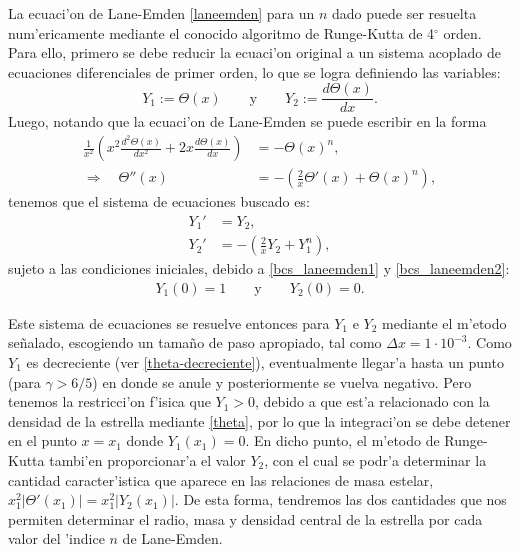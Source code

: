La ecuaci'on de Lane-Emden \eqref{laneemden} para un $n$ dado puede ser resuelta  num'ericamente mediante el conocido algoritmo de Runge-Kutta de 4${}^{\circ}$ orden. Para ello, primero se debe reducir la ecuaci'on original a un sistema acoplado de ecuaciones diferenciales de primer orden, lo que se logra definiendo las variables:
\begin{equation}
Y_1:=\Theta(x)\qquad\text{y}\qquad Y_2:=\frac{d\Theta(x)}{dx}.
\end{equation}
Luego, notando que la ecuaci'on de Lane-Emden se puede escribir en la forma
\begin{align}
 \frac{1}{x^2}\left(x^2\frac{d^2\Theta(x)}{dx^2}+2x\frac{d\Theta(x)}{dx}\right)&=-\Theta(x)^n,\\
\Rightarrow\quad \Theta''(x)&=-\left(\frac{2}{x}\Theta'(x)+\Theta(x)^n\right),
\end{align}
tenemos que el sistema de ecuaciones buscado es:
\begin{equation}
\boxed{
\begin{aligned}
 Y_1'&=Y_2,\\
Y_2'&=-\left(\frac{2}{x}Y_2+Y_1^n\right),
\end{aligned}}
\end{equation}
sujeto a las condiciones iniciales, debido a \eqref{bcs_laneemden1} y \eqref{bcs_laneemden2}:
\begin{align}
 Y_1(0)=1\qquad\text{y}\qquad Y_2(0)=0.
\end{align}

Este sistema de ecuaciones se resuelve entonces para $Y_1$ e $Y_2$ mediante el m'etodo se\~nalado, escogiendo un tama\~no de paso apropiado, tal como $\Delta x=1\cdot10^{-3}$. Como $Y_1$ es decreciente (ver \eqref{theta-decreciente}), eventualmente llegar'a hasta un punto (para $\gamma>6/5$) en donde se anule y posteriormente se vuelva negativo. Pero tenemos la restricci'on f'isica que $Y_1>0$, debido a que est'a relacionado con la densidad de la estrella mediante \eqref{theta}, por lo que la integraci'on se debe detener en el punto $x=x_1$ donde $Y_1(x_1)=0$. En dicho punto, el m'etodo de Runge-Kutta tambi'en proporcionar'a el valor $Y_2$, con el cual se podr'a determinar la cantidad caracter'istica que aparece en las relaciones de masa estelar, $x_1^2\left|\Theta'(x_1)\right|=x_1^2\left|Y_2(x_1)\right|$. De esta forma, tendremos las dos cantidades que nos permiten determinar el radio, masa y densidad central de la estrella por cada valor del 'indice $n$ de Lane-Emden.

